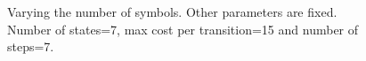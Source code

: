 \begin{figure}[H]



  \caption{Varying the number of symbols. Other parameters are fixed. Number of states=7, max cost per transition=15 and number of steps=7.}\label{fig:symbols}
\end{figure}
